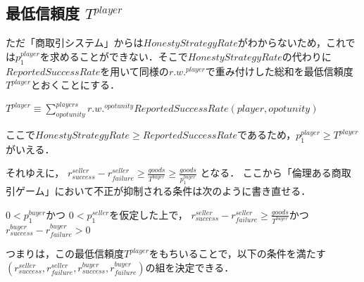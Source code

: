 \subsection{最低信頼度 $ T^{player} $}

ただ「商取引システム」からは$ HonestyStrategyRate $がわからないため，これでは$ p^{player}_1 $を求めることができない．そこで$ HonestyStrategyRate $の代わりに$ ReportedSuccessRate $を用いて同様の$ r.w.^{player} $で重み付けした総和を最低信頼度$ T^{player} $とおくことにする．

$ T^{player} \equiv \sum^{players}_{opotunity} {r.w.}^{opotunity} ReportedSuccessRate(player, opotunity) $

ここで$ HonestyStrategyRate \geq ReportedSuccessRate $であるため，$ p^{player}_1 \geq T^{player} $がいえる．

それゆえに，
$ r^{seller}_{success} - r^{seller}_{failure}  \geq \frac{goods}{T^{buyer}} \geq \frac{goods}{p^{buyer}_1} $
となる．
ここから「倫理ある商取引ゲーム」において不正が抑制される条件は次のように書き直せる．

$ 0<p^{buyer}_1 $かつ $ 0 < p^{seller}_{1} $を仮定した上で，
$ r^{seller}_{success} - r^{seller}_{failure} \geq \frac{goods}{T^{buyer}} $かつ$ r^{buyer}_{success} - r^{buyer}_{failure} > 0 $

つまりは，この最低信頼度$ T^{player} $をもちいることで，以下の条件を満たす$ (r^{seller}_{success}, r^{seller}_{failure}, r^{buyer}_{success}, r^{buyer}_{failure}) $の組を決定できる．
